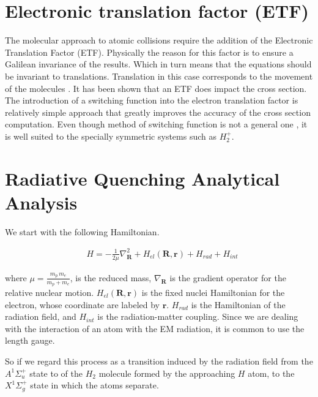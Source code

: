 \section{Electronic translation factor (ETF) \cite{ETF1}\cite{ETF2}\cite{ETF3}}

The molecular approach to atomic collisions require the addition of the Electronic Translation Factor (ETF). Physically the reason for this factor is to ensure a Galilean invariance of the results. Which in turn means that the equations should be invariant to translations. Translation in this case corresponds to the movement of the molecules \cite{ETF2}. It has been shown \cite{ETF2} that an ETF does impact the cross section.
The introduction of a switching function into the electron translation factor is relatively simple approach that greatly improves the accuracy of the cross section computation. Even though method of switching function is not a general one \cite{ETF3}, it is well suited to the specially symmetric systems such as $ H_{2}^{+} $.

\section{Radiative Quenching Analytical Analysis}

We start with the following Hamiltonian.

\begin{equation}\label{eqH1} 
\begin{split} 
& H = -\frac{1}{2\mu}\nabla^2_{\mathbf{R}} + H_{el}(\mathbf{R},\mathbf{r}) + H_{rad} + H_{int} 
\end{split} 
\end{equation} 

where $ \mu = \frac{m_p\,m_e}{m_p + m_e} $, is the reduced mass, $ \nabla_{\mathbf{R}} $ is the gradient operator for the relative nuclear motion. $ H_{el}(\mathbf{R},\mathbf{r}) $ is the fixed nuclei Hamiltonian for the electron, whose coordinate are labeled by $ \mathbf{r} $. $ H_{rad} $ is the Hamiltonian of the radiation field, and $ H_{int} $ is the radiation-matter coupling. Since we are dealing with the interaction of an atom with the EM radiation, it is common to use the length gauge.  

So if we regard this process as a transition induced by the radiation field from the $ A^{1}\Sigma^{+}_u $ state to of the $ H_2 $ molecule formed by the approaching $ H $ atom, to the $ X^{1}\Sigma^{+}_g $ state in which the atoms separate.

